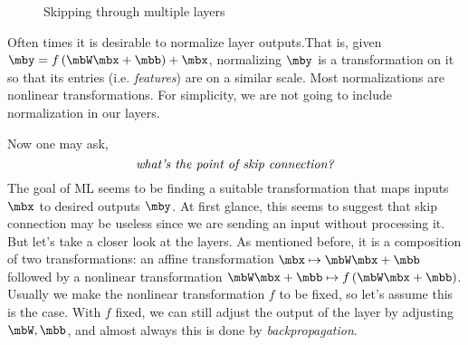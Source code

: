 \documentclass[11pt]{article}
\begin{document}
    \begin{figure}[H]
        \center
            \begin{center}
            \end{center}
        \caption{Skipping through multiple layers}
    \end{figure}

    \begin{remark}{}
        Often times it is desirable to normalize layer outputs.\footnotemark[1] That is, given
        $\mby = f\left( \mbW\mbx+\mbb \right) + \mbx$,
        normalizing $\mby$ is a transformation on it so that its entries (i.e. \textit{features}) are on a similar scale. Most normalizations are nonlinear transformations. For simplicity, we are not going to include normalization in our layers.

        \noindent
        \begin{minipage}{\textwidth}
        \end{minipage}
    \end{remark}

    \np Now one may ask,
    \begin{equation*}
        \text{\textit{what's the point of skip connection?}}
    \end{equation*}
    The goal of ML seems to be finding a suitable transformation that maps inputs $\mbx$ to desired outputs $\mby$. At first glance, this seems to suggest that skip connection may be useless since we are sending an input without processing it. But let's take a closer look at the layers. As mentioned before, it is a composition of two transformations: an affine transformation $\mbx\mapsto\mbW\mbx+\mbb$ followed by a nonlinear transformation $\mbW\mbx+\mbb\mapsto f\left( \mbW\mbx+\mbb \right)$. Usually we make the nonlinear transformation $f$ to be fixed, so let's assume this is the case. With $f$ fixed, we can still adjust the output of the layer by adjusting $\mbW,\mbb$, and almost always this is done by \textit{backpropagation}.
\end{document}
